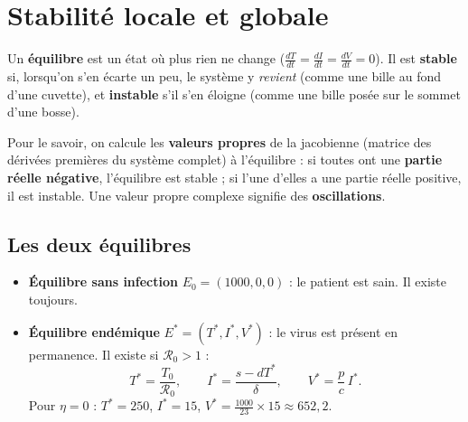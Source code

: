 \documentclass[11pt,a4paper]{report}
\theoremstyle{plain}
\theoremstyle{definition}
\theoremstyle{remark}
\newcommand{\Rzero}{\mathcal{R}_0}
\begin{document}
\section{Stabilité locale et globale}

\begin{cadreconcept}
Un \textbf{équilibre} est un état où plus rien ne change ($\frac{dT}{dt}=\frac{dI}{dt}=\frac{dV}{dt}=0$). Il est \textbf{stable} si, lorsqu'on s'en écarte un peu, le système y \emph{revient} (comme une bille au fond d'une cuvette), et \textbf{instable} s'il s'en éloigne (comme une bille posée sur le sommet d'une bosse).

Pour le savoir, on calcule les \textbf{valeurs propres} de la jacobienne (matrice des dérivées premières du système complet) à l'équilibre : si toutes ont une \textbf{partie réelle négative}, l'équilibre est stable ; si l'une d'elles a une partie réelle positive, il est instable. Une valeur propre complexe signifie des \textbf{oscillations}.
\end{cadreconcept}

\subsection*{Les deux équilibres}
\begin{itemize}
    \item \textbf{Équilibre sans infection} $E_0=(1000,0,0)$ : le patient est sain. Il existe toujours.
    \item \textbf{Équilibre endémique} $E^*=(T^*,I^*,V^*)$ : le virus est présent en permanence. Il existe si $\Rzero>1$ :
    $$T^*=\frac{T_0}{\Rzero},\qquad I^*=\frac{s-dT^*}{\delta},\qquad V^*=\frac pc\,I^*.$$
    Pour $\eta=0$ : $T^*=250$, $I^*=15$, $V^*=\frac{1000}{23}\times15\approx652{,}2$.
\end{itemize}
\end{document}
